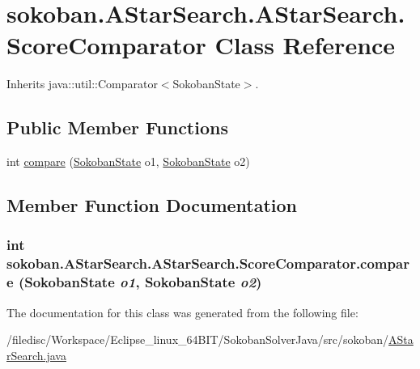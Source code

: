 \hypertarget{classsokoban_1_1AStarSearch_1_1ScoreComparator}{
\section{sokoban.AStarSearch.AStarSearch.ScoreComparator Class Reference}
\label{classsokoban_1_1AStarSearch_1_1ScoreComparator}
}
Inherits java::util::Comparator$<$SokobanState$>$.

\subsection*{Public Member Functions}
\begin{CompactItemize}
\item 
int \hyperlink{classsokoban_1_1AStarSearch_1_1ScoreComparator_e031b939d3a6351d8f2e11c796012e8b}{compare} (\hyperlink{classsokoban_1_1SokobanState}{SokobanState} o1, \hyperlink{classsokoban_1_1SokobanState}{SokobanState} o2)
\end{CompactItemize}


\subsection{Member Function Documentation}
\hypertarget{classsokoban_1_1AStarSearch_1_1ScoreComparator_e031b939d3a6351d8f2e11c796012e8b}{
\subsubsection[{compare}]{\setlength{\rightskip}{0pt plus 5cm}int sokoban.AStarSearch.AStarSearch.ScoreComparator.compare ({\bf SokobanState} {\em o1}, \/  {\bf SokobanState} {\em o2})}}
\label{classsokoban_1_1AStarSearch_1_1ScoreComparator_e031b939d3a6351d8f2e11c796012e8b}




The documentation for this class was generated from the following file:\begin{CompactItemize}
\item 
/filedisc/Workspace/Eclipse\_\-linux\_\-64BIT/SokobanSolverJava/src/sokoban/\hyperlink{AStarSearch_8java}{AStarSearch.java}\end{CompactItemize}
